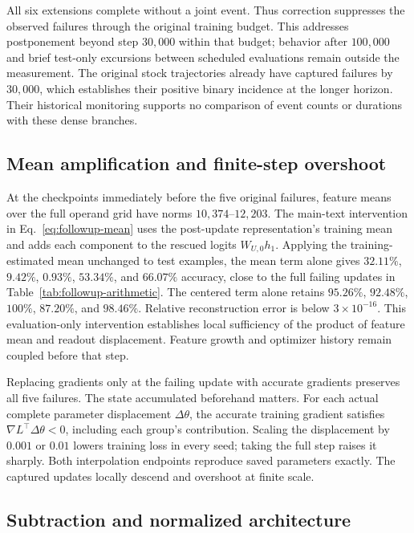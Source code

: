 All six extensions complete without a joint event. Thus correction suppresses the observed failures through the original training budget. This addresses postponement beyond step $30{,}000$ within that budget; behavior after $100{,}000$ and brief test-only excursions between scheduled evaluations remain outside the measurement. The original stock trajectories already have captured failures by $30{,}000$, which establishes their positive binary incidence at the longer horizon. Their historical monitoring supports no comparison of event counts or durations with these dense branches.

\subsection{Mean amplification and finite-step overshoot}
\label{app:mean-update}

At the checkpoints immediately before the five original failures, feature means over the full operand grid have norms $10{,}374$--$12{,}203$. The main-text intervention in Eq.~\ref{eq:followup-mean} uses the post-update representation's training mean and adds each component to the rescued logits $W_{U,0}h_1$.
Applying the training-estimated mean unchanged to test examples, the mean term alone gives $32.11\%$, $9.42\%$, $0.93\%$, $53.34\%$, and $66.07\%$ accuracy, close to the full failing updates in Table~\ref{tab:followup-arithmetic}. The centered term alone retains $95.26\%$, $92.48\%$, $100\%$, $87.20\%$, and $98.46\%$. Relative reconstruction error is below $3\times10^{-16}$. This evaluation-only intervention establishes local sufficiency of the product of feature mean and readout displacement. Feature growth and optimizer history remain coupled before that step.

Replacing gradients only at the failing update with accurate gradients preserves all five failures. The state accumulated beforehand matters. For each actual complete parameter displacement $\Delta\theta$, the accurate training gradient satisfies $\nabla L^{\top}\Delta\theta<0$, including each group's contribution. Scaling the displacement by $0.001$ or $0.01$ lowers training loss in every seed; taking the full step raises it sharply. Both interpolation endpoints reproduce saved parameters exactly. The captured updates locally descend and overshoot at finite scale.



\subsection{Subtraction and normalized architecture}
\label{app:normalized}

